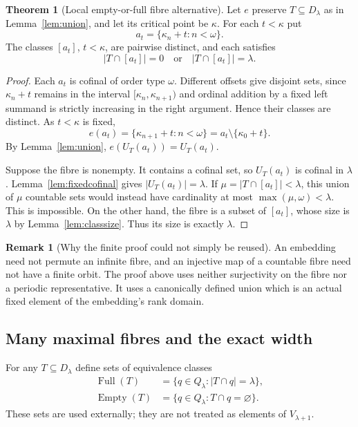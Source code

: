 \documentclass[11pt,letterpaper]{article}
\theoremstyle{definition}
\newtheorem{theorem}[definition]{Theorem}
\newtheorem{remark}[definition]{Remark}
\numberwithin{equation}{section}
\newcommand{\Full}{\operatorname{Full}}
\newcommand{\Empty}{\operatorname{Empty}}
\begin{document}
\begin{theorem}[Local empty-or-full fibre alternative]\label{thm:localfibre}
Let $e$ preserve $T\subseteq D_\lambda$ as in Lemma~\ref{lem:union}, and let its critical point be $\kappa$. For each $t<\kappa$ put
\[
 a_t=\{\kappa_n+t:n<\omega\}.
\]
The classes $[a_t]$, $t<\kappa$, are pairwise distinct, and each satisfies
\begin{equation}\label{eq:emptyfull}
 |T\cap[a_t]|=0\quad\text{or}\quad |T\cap[a_t]|=\lambda.
\end{equation}
\end{theorem}

\begin{proof}
Each $a_t$ is cofinal of order type $\omega$. Different offsets give disjoint sets, since $\kappa_n+t$ remains in the interval $[\kappa_n,\kappa_{n+1})$ and ordinal addition by a fixed left summand is strictly increasing in the right argument. Hence their classes are distinct. As $t<\kappa$ is fixed,
\[
 e(a_t)=\{\kappa_{n+1}+t:n<\omega\}=a_t\setminus\{\kappa_0+t\}.
\]
By Lemma~\ref{lem:union}, $e(U_T(a_t))=U_T(a_t)$.

Suppose the fibre is nonempty. It contains a cofinal set, so $U_T(a_t)$ is cofinal in $\lambda$. Lemma~\ref{lem:fixedcofinal} gives $|U_T(a_t)|=\lambda$. If $\mu=|T\cap[a_t]|<\lambda$, this union of $\mu$ countable sets would instead have cardinality at most $\max(\mu,\omega)<\lambda$. This is impossible. On the other hand, the fibre is a subset of $[a_t]$, whose size is $\lambda$ by Lemma~\ref{lem:classsize}. Thus its size is exactly $\lambda$.
\end{proof}

\begin{remark}[Why the finite proof could not simply be reused]
An embedding need not permute an infinite fibre, and an injective map of a countable fibre need not have a finite orbit. The proof above uses neither surjectivity on the fibre nor a periodic representative. It uses a canonically defined union which is an actual fixed element of the embedding's rank domain.
\end{remark}

\subsection{Many maximal fibres and the exact width}

For any $T\subseteq D_\lambda$ define sets of equivalence classes
\begin{align}
 \Full(T)&=\{q\in Q_\lambda:|T\cap q|=\lambda\},\\
 \Empty(T)&=\{q\in Q_\lambda:T\cap q=\varnothing\}.
\end{align}
These sets are used externally; they are not treated as elements of $V_{\lambda+1}$.
\end{document}
